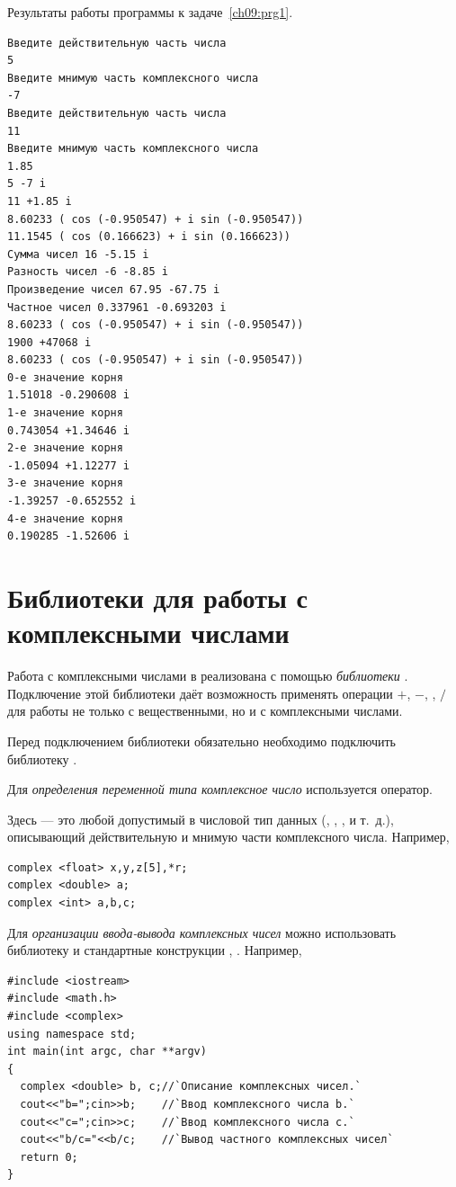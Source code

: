 Результаты работы программы к задаче~\ref{ch09:prg1}.
\begin{verbatim}
Введите действительную часть числа
5
Введите мнимую часть комплексного числа
-7
Введите действительную часть числа
11
Введите мнимую часть комплексного числа
1.85
5 -7 i
11 +1.85 i
8.60233 ( cos (-0.950547) + i sin (-0.950547))
11.1545 ( cos (0.166623) + i sin (0.166623))
Сумма чисел 16 -5.15 i
Разность чисел -6 -8.85 i
Произведение чисел 67.95 -67.75 i
Частное чисел 0.337961 -0.693203 i
8.60233 ( cos (-0.950547) + i sin (-0.950547))
1900 +47068 i
8.60233 ( cos (-0.950547) + i sin (-0.950547))
0-е значение корня
1.51018 -0.290608 i
1-е значение корня
0.743054 +1.34646 i
2-е значение корня
-1.05094 +1.12277 i
3-е значение корня
-1.39257 -0.652552 i
4-е значение корня
0.190285 -1.52606 i
\end{verbatim}



\section[Библиотеки для работы с комплексными числами]{Библиотеки для работы с комплексными числами}
Работа с комплексными числами в  реализована с помощью \emph{библиотеки} 
. Подключение этой библиотеки даёт
возможность применять операции $+$, $-$, \Sys{*}, $/$ для работы не только с вещественными, но и с комплексными числами.

Перед подключением библиотеки  обязательно необходимо подключить библиотеку
.

Для \emph{определения переменной 
типа комплексное число} используется оператор.


Здесь  --- это любой допустимый в  числовой тип данных (,
, ,  и т.~д.), описывающий действительную и
мнимую части комплексного числа. Например,
\begin{lstlisting}
complex <float> x,y,z[5],*r;
complex <double> a;
complex <int> a,b,c;
\end{lstlisting}
Для \emph{организации ввода-вывода
комплексных чисел} можно использовать библиотеку  и стандартные
конструкции , . Например,
\begin{lstlisting}
#include <iostream>
#include <math.h>
#include <complex>
using namespace std;
int main(int argc, char **argv)
{
  complex <double> b, c;//`Описание комплексных чисел.`
  cout<<"b=";cin>>b;    //`Ввод комплексного числа b.`
  cout<<"c=";cin>>c;    //`Ввод комплексного числа c.`
  cout<<"b/c="<<b/c;    //`Вывод частного комплексных чисел`
  return 0;
}
\end{lstlisting}

